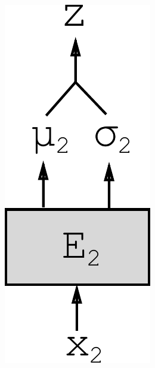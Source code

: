 \documentclass{article}
\begin{document}
\begin{figure}[h!]
\begin{subfigure}[b]{.10\linewidth}
        \includegraphics[width=.75\linewidth]{modelv1}
        \caption{}
        \label{fig:diagram:modelv1}
    \end{subfigure}\hspace{5mm}
    \begin{subfigure}[b]{.15\linewidth}

\end{subfigure}
\end{figure}
\end{document}
